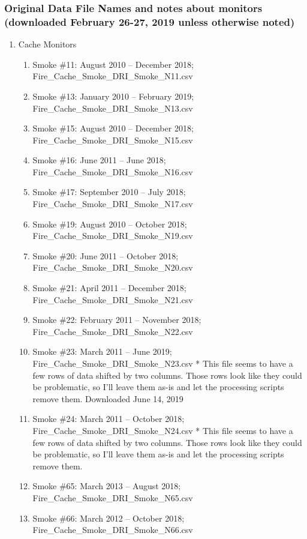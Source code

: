 \subsubsection*{Original Data File Names and notes about monitors (downloaded February 26-27, 2019 unless otherwise noted)}
 \renewcommand{\labelenumii}{\arabic{enumii}}
\begin{enumerate}%
\item Cache Monitors

\begin{enumerate}[nolistsep]
\item Smoke \#11: August 2010 -- December 2018; Fire\_Cache\_Smoke\_DRI\_Smoke\_N11.csv
\item Smoke \#13: January 2010 -- February 2019; Fire\_Cache\_Smoke\_DRI\_Smoke\_N13.csv
\item Smoke \#15: August 2010 -- December 2018; Fire\_Cache\_Smoke\_DRI\_Smoke\_N15.csv
\item Smoke \#16: June 2011 -- June 2018; Fire\_Cache\_Smoke\_DRI\_Smoke\_N16.csv
\item Smoke \#17: September 2010 -- July 2018; Fire\_Cache\_Smoke\_DRI\_Smoke\_N17.csv
\item Smoke \#19: August 2010 -- October 2018; Fire\_Cache\_Smoke\_DRI\_Smoke\_N19.csv
\item Smoke \#20: June 2011 -- October 2018; Fire\_Cache\_Smoke\_DRI\_Smoke\_N20.csv
\item Smoke \#21: April 2011 -- December 2018; Fire\_Cache\_Smoke\_DRI\_Smoke\_N21.csv
\item Smoke \#22: February 2011 -- November 2018; Fire\_Cache\_Smoke\_DRI\_Smoke\_N22.csv
\item Smoke \#23: March 2011 -- June 2019; Fire\_Cache\_Smoke\_DRI\_Smoke\_N23.csv * This file seems to have a few rows of data shifted by two columns. Those rows look like they could be problematic, so I'll leave them as-is and let the processing scripts remove them. Downloaded June 14, 2019
\item Smoke \#24: March 2011 -- October 2018; Fire\_Cache\_Smoke\_DRI\_Smoke\_N24.csv * This file seems to have a few rows of data shifted by two columns. Those rows look like they could be problematic, so I'll leave them as-is and let the processing scripts remove them.
\item Smoke \#65: March 2013 -- August 2018; Fire\_Cache\_Smoke\_DRI\_Smoke\_N65.csv
\item Smoke \#66: March 2012 -- October 2018; Fire\_Cache\_Smoke\_DRI\_Smoke\_N66.csv

\end{enumerate}
\end{enumerate}
